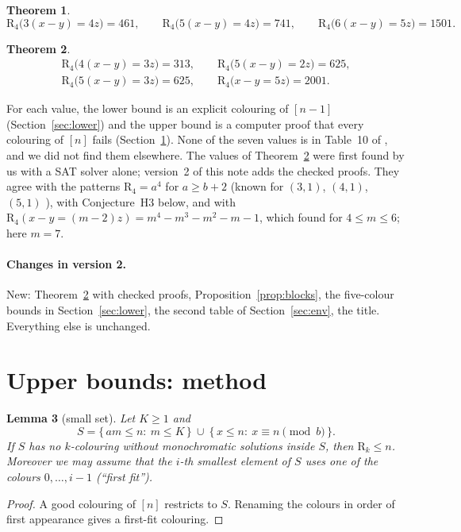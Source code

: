 \documentclass[11pt,a4paper]{article}
\newtheorem{theorem}{Theorem}[section]
\newtheorem{lemma}[theorem]{Lemma}
\theoremstyle{definition}
\theoremstyle{remark}
\newcommand{\R}{\mathrm{R}}
\begin{document}
\begin{theorem}\label{thm:main}
\[
  \R_4\bigl(3(x-y)=4z\bigr)=461,\qquad \R_4\bigl(5(x-y)=4z\bigr)=741,\qquad \R_4\bigl(6(x-y)=5z\bigr)=1501 .
\]
\end{theorem}
\begin{theorem}\label{thm:main2}
\[
\begin{gathered}
  \R_4\bigl(4(x-y)=3z\bigr)=313,\qquad \R_4\bigl(5(x-y)=2z\bigr)=625,\\
  \R_4\bigl(5(x-y)=3z\bigr)=625,\qquad \R_4\bigl(x-y=5z\bigr)=2001 .
\end{gathered}
\]
\end{theorem}
For each value, the lower bound is an explicit colouring of $[n-1]$ (Section~\ref{sec:lower}) and the upper bound is a computer proof that every colouring of $[n]$ fails (Section~\ref{sec:method}). None of the seven values is in Table~10 of \cite{CDW22}, and we did not find them elsewhere. The values of Theorem~\ref{thm:main2} were first found by us with a SAT solver alone; version~2 of this note adds the checked proofs. They agree with the patterns $\R_4=a^4$ for $a\ge b+2$ (known for $(3,1)$, $(4,1)$, $(5,1)$ \cite{CDW22}), with Conjecture~H3 below, and with $\R_4(x-y=(m-2)z)=m^4-m^3-m^2-m-1$, which \cite{CDW22} found for $4\le m\le6$; here $m=7$.

\paragraph{Changes in version 2.} New: Theorem~\ref{thm:main2} with checked proofs, Proposition~\ref{prop:blocks}, the five-colour bounds in Section~\ref{sec:lower}, the second table of Section~\ref{sec:env}, the title. Everything else is unchanged.

\clearpage
\section{Upper bounds: method}\label{sec:method}
\begin{lemma}[small set]\label{lem:small}
Let $K\ge1$ and
\[
  S=\{\,am\le n:\ m\le K\,\}\ \cup\ \{\,x\le n:\ x\equiv n\pmod b\,\}.
\]
If $S$ has no $k$-colouring without monochromatic solutions inside $S$, then $\R_k\le n$. Moreover we may assume that the $i$-th smallest element of $S$ uses one of the colours $0,\dots,i-1$ (``first fit'').
\end{lemma}
\begin{proof}
A good colouring of $[n]$ restricts to $S$. Renaming the colours in order of first appearance gives a first-fit colouring.
\end{proof}
\end{document}
